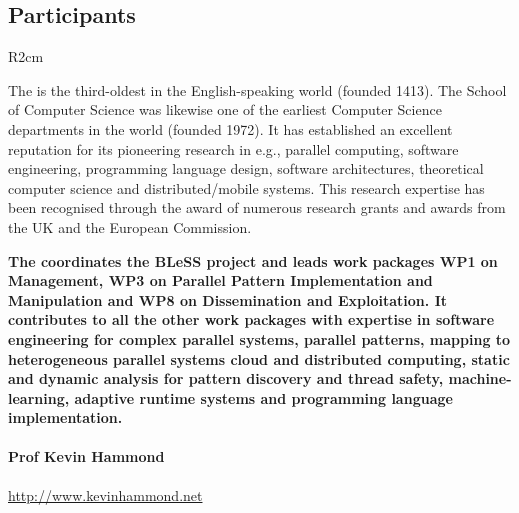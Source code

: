 \documentclass[a4paper,11pt]{article}
\newcommand{\project}[1]{\textbf{#1}\xspace}
\newcommand{\BLESS}{\project{BLeSS}}
\newcommand{\TheProject}{\BLESS}
\begin{document}
\subsection{Participants}

\begin{wrapfigure}{R}{2cm}
\vspace{-3.95cm}
\hfill {}
\vspace{-1cm}
\end{wrapfigure}

\label{sec:participantUSTAN}

The \SAlong{} is the third-oldest in the English-speaking world (founded 1413).
The School of Computer Science was likewise one of the earliest Computer Science departments in the world (founded 1972).
It has established an excellent reputation for its pioneering research in e.g.,
parallel computing, software engineering, programming language design,
software architectures, theoretical computer science and
distributed/mobile systems.  This research expertise has been
recognised through the award of numerous research grants and
awards from the UK and the European Commission.

\vspace{10pt}
\textbf{The \SAlong{} coordinates the \TheProject{} project and
leads work packages WP1 on Management, WP3 on Parallel Pattern Implementation and Manipulation and WP8 on Dissemination
and Exploitation.
It contributes to all the other work packages with expertise in software engineering for complex parallel systems,
parallel patterns, mapping to heterogeneous parallel systems
cloud and distributed computing, static and dynamic analysis for pattern discovery and thread safety, machine-learning,
adaptive runtime systems and programming language implementation.}
\vspace{10pt}

\paragraph{Prof Kevin Hammond} \url{http://www.kevinhammond.net}
\end{document}
